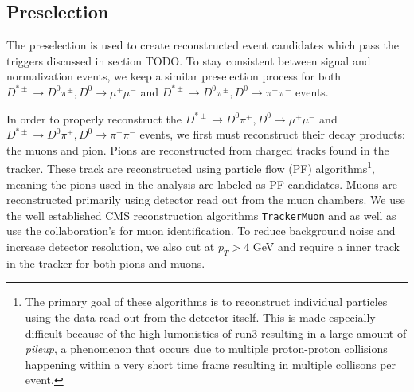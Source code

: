 \subsection{Preselection}

The preselection is used to create reconstructed event candidates which pass the triggers discussed in section TODO. To stay consistent between signal and normalization events, we keep a similar preselection process for both $D^{*\pm} \to D^0 \pi^\pm, D^0 \to \mu^+ \mu^-$ and $D^{*\pm} \to D^0 \pi^\pm, D^0 \to \pi^+ \pi^-$ events.

In order to properly reconstruct the $D^{*\pm} \to D^0 \pi^\pm, D^0 \to \mu^+ \mu^-$ and $D^{*\pm} \to D^0 \pi^\pm, D^0 \to \pi^+ \pi^-$ events, we first must reconstruct their decay products: the muons and pion. Pions are reconstructed from charged tracks found in the tracker. These track are reconstructed using particle flow (PF) algorithms\footnote{The primary goal of these algorithms is to reconstruct individual particles using the data read out from the detector itself. This is made especially difficult because of the high lumonisties of run3 resulting in a large amount of \textit{pileup}, a phenomenon that occurs due to multiple proton-proton collisions happening within a very short time frame resulting in multiple collisons per event. }, meaning the pions used in the analysis are labeled as PF candidates. Muons are reconstructed primarily using detector read out from the muon chambers. We use the well established CMS reconstruction algorithms \texttt{TrackerMuon} and  as well as use the collaboration's  for muon identification. To reduce background noise and increase detector resolution, we also cut at $p_T>4$ GeV and require a  inner track in the tracker for both pions and muons.

